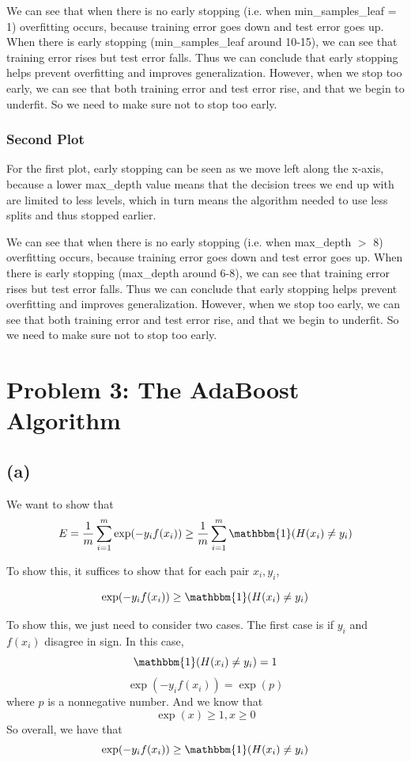 \documentclass{article}
\begin{document}
We can see that when there is no early stopping (i.e. when min\_samples\_leaf = 1)
overfitting occurs, because training error goes down and test error goes up.
When there is early stopping (min\_samples\_leaf around 10-15), we can see that
training error rises but test error falls. Thus we can conclude that early stopping
helps prevent overfitting and improves generalization. However, when we stop too
early, we can see that both training error and test error rise, and that we
begin to underfit. So we need to make sure not to stop too early.

\subsubsection*{Second Plot}
For the first plot, early stopping can be seen as we move left along the x-axis,
because a lower max\_depth value means that the decision trees we end up with
are limited to less levels, which in turn means the algorithm needed to use less
splits and thus stopped earlier.

We can see that when there is no early stopping (i.e. when max\_depth $>$ 8)
overfitting occurs, because training error goes down and test error goes up.
When there is early stopping (max\_depth around 6-8), we can see that training error
rises but test error falls. Thus we can conclude that early stopping helps prevent overfitting and
improves generalization. However, when we stop too early, we can see that
both training error and test error rise, and that we begin to underfit. So we need
to make sure not to stop too early.

\newpage
\section*{Problem 3: The AdaBoost Algorithm}
\subsection*{(a)}
We want to show that
\[ E = \frac{1}{m} \sum_{i = 1}^m \exp(-y_i f(x_i)) \geq \frac{1}{m} \sum_{i = 1}^m
    \mathbbm{1} (H(x_i) \neq y_i) \]

To show this, it suffices to show that for each pair $x_i, y_i$,

\[ \exp(-y_i f(x_i)) \geq \mathbbm{1} (H(x_i) \neq y_i) \]

To show this, we just need to consider two cases. The first case is
if $y_i$ and $f(x_i)$ disagree in sign. In this case,
\[ \mathbbm{1} (H(x_i) \neq y_i) = 1 \]
\[ \exp(-y_i f(x_i)) = \exp(p) \]
where $p$ is a nonnegative number. And we know that
\[ \exp(x) \geq 1, x \geq 0 \]
So overall, we have that
\[ \exp(-y_i f(x_i)) \geq \mathbbm{1} (H(x_i) \neq y_i) \]
\end{document}
